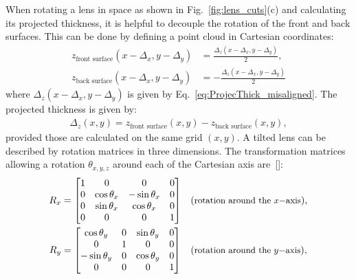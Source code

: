 \begin{refsection}
When rotating a lens in space as shown in Fig.~\ref{fig:lens_cuts}(c) and calculating its projected thickness, it is helpful to decouple the rotation of the front and back surfaces. This can be done by defining a point cloud in Cartesian coordinates:
\begin{subequations}\label{eq:point_cloud}
    \begin{align}
    z_\text{front surface}(x-\Delta_x,y-\Delta_y) &=\frac{\Delta_z(x-\Delta_x,y-\Delta_y)}{2},\\
    z_\text{back surface}(x-\Delta_x,y-\Delta_y) &= -\frac{\Delta_z(x-\Delta_x,y-\Delta_y)}{2}
    \end{align}
\end{subequations}{}
where $\Delta_z(x-\Delta_x,y-\Delta_y)$ is given by Eq.~\ref{eq:ProjecThick_misaligned}. The projected thickness is given by:
\begin{align}\label{eq:point_cloud_thickness}
    \Delta_z(x,y) = z_\text{front surface}(x,y) - z_\text{back surface}(x,y),
\end{align}{}
provided those are calculated on the same grid $(x,y)$. A tilted lens can be described by rotation matrices in three dimensions. The transformation matrices allowing a rotation $\theta_{x,y,z}$ around each of the Cartesian axis are~[\cite{House2016}]:
\begin{subequations}\label{eq:affine}
    \begin{align}
        R_x &= \begin{bmatrix}
                            1 & 0 & 0 &0\\
                            0 & \cos\theta_x & -\sin{\theta_x}  &0\\
                            0 & \sin\theta_x & \cos\theta_x &0\\
                            0 & 0 & 0 &1
            \end{bmatrix}  &&(\small{\text{rotation around the $x-$axis}}),\\
            R_y &= \begin{bmatrix}
                            \cos\theta_y & 0 & \sin\theta_y &0\\
                            0 & 1 & 0 &0\\
                            -\sin\theta_y & 0 & \cos\theta_y &0\\
                            0 & 0 & 0 &1
            \end{bmatrix}  &&(\small{\text{rotation around the $y-$axis}}),\\

\end{align}
\end{subequations}
\end{refsection}
